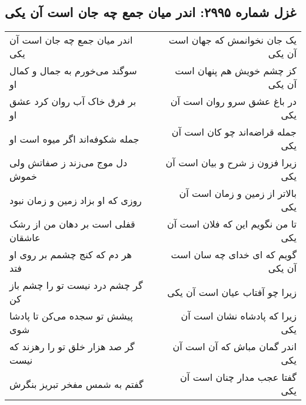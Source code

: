 \begin{center}
\section*{غزل شماره ۲۹۹۵: اندر میان جمع چه جان است آن یکی}
\label{sec:2995}
\begin{longtable}{l p{0.5cm} r}
اندر میان جمع چه جان است آن یکی
&&
یک جان نخوانمش که جهان است آن یکی
\\
سوگند می‌خورم به جمال و کمال او
&&
کز چشم خویش هم پنهان است آن یکی
\\
بر فرق خاک آب روان کرد عشق او
&&
در باغ عشق سرو روان است آن یکی
\\
جمله شکوفه‌اند اگر میوه است او
&&
جمله قراضه‌اند چو کان است آن یکی
\\
دل موج می‌زند ز صفاتش ولی خموش
&&
زیرا فزون ز شرح و بیان است آن یکی
\\
روزی که او بزاد زمین و زمان نبود
&&
بالاتر از زمین و زمان است آن یکی
\\
قفلی است بر دهان من از رشک عاشقان
&&
تا من نگویم این که فلان است آن یکی
\\
هر دم که کنج چشمم بر روی او فتد
&&
گویم که ای خدای چه سان است آن یکی
\\
گر چشم درد نیست تو را چشم باز کن
&&
زیرا چو آفتاب عیان است آن یکی
\\
پیشش تو سجده می‌کن تا پادشا شوی
&&
زیرا که پادشاه نشان است آن یکی
\\
گر صد هزار خلق تو را رهزند که نیست
&&
اندر گمان مباش که آن است آن یکی
\\
گفتم به شمس مفخر تبریز بنگرش
&&
گفتا عجب مدار چنان است آن یکی
\\
\end{longtable}
\end{center}
